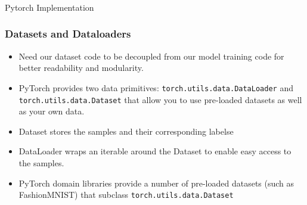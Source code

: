 



\begin{frame}[fragile]\frametitle{}

\begin{center}
{\Large Pytorch Implementation}
\end{center}
\end{frame}

\begin{frame}[fragile]
\frametitle{Datasets and Dataloaders}

\begin{itemize}
\item Need our dataset code to be decoupled from our model training code for better readability and modularity. 
\item PyTorch provides two data primitives: \lstinline|torch.utils.data.DataLoader| and \lstinline|torch.utils.data.Dataset| that allow you to use pre-loaded datasets as well as your own data. 
\item Dataset stores the samples and their corresponding labelse
\item  DataLoader wraps an iterable around the Dataset to enable easy access to the samples.
\item PyTorch domain libraries provide a number of pre-loaded datasets (such as FashionMNIST) that subclass \lstinline|torch.utils.data.Dataset|
\end{itemize}

\end{frame} 

